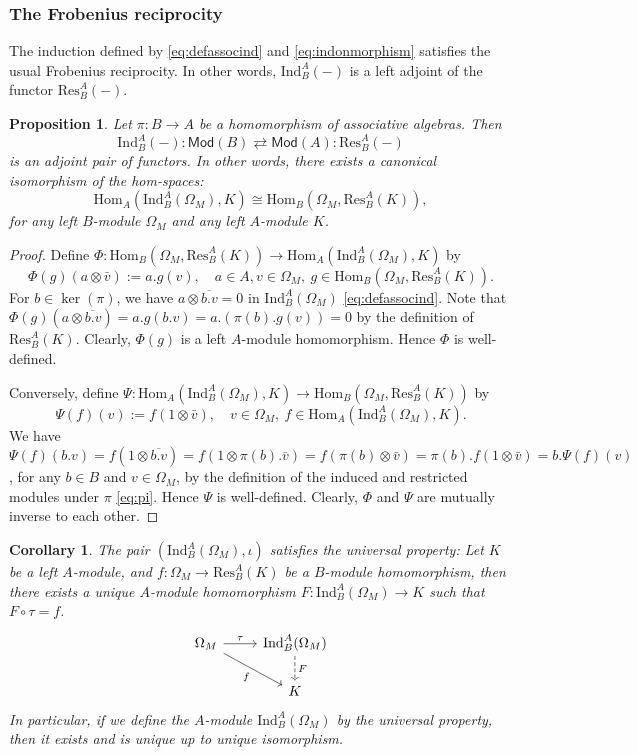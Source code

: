 \documentclass[12pt,a4paper,reqno]{amsart}
\numberwithin{equation}{section}
\numberwithin{equation}{section}
\newtheorem{prop}[thm]{Proposition}
\newtheorem{coro}[thm]{Corollary}
\theoremstyle{definition}
\def \ra {\rightarrow}
\def \Hom {\mathrm{Hom}}
\def\Ind{\mathrm{Ind}}
\def\Res{\mathrm{Res}}
\def\o{\otimes}
\def\Om{\Omega}
\def\Ind{\mathrm{Ind}}
\def\Mod{\mathsf{Mod}}
\begin{document}
	\subsubsection{The Frobenius reciprocity} The induction defined by \eqref{eq:defassocind} and \eqref{eq:indonmorphism} satisfies the usual Frobenius reciprocity. In other words, $\Ind_B^A(-)$ is a left adjoint of the functor $\Res^A_B(-)$.
	\begin{prop}\label{prop:Frobenius}
		Let $\pi: B\ra A$ be a homomorphism of associative algebras. Then 
		\begin{equation}
			\Ind_B^A(-):\Mod(B)\rightleftarrows \Mod(A): \Res_B^A(-)
		\end{equation}
		is an adjoint pair of functors. In other words, there exists a canonical isomorphism of the hom-spaces:
		\begin{equation}
			\Hom_A(\Ind_B^A(\Om_M),K)\cong \Hom_B(\Om_M,\Res^A_B(K)),
		\end{equation}
		for any left $B$-module $\Om_M$ and any left $A$-module $K$. 
	\end{prop}
	\begin{proof}
		Define $\Phi:  \Hom_B(\Om_M,\Res^A_B(K))\ra \Hom_A(\Ind_B^A(\Om_M),K)$ by
		$$\Phi(g)(a\o \bar{v}):=a.g(v),\quad a\in A, v\in \Om_M,\ g\in  \Hom_B(\Om_M,\Res^A_B(K)). $$ 
		For $b\in \ker(\pi)$, we have $a\o \overline{b.v}=0$ in $\Ind^A_B(\Om_M)$ \eqref{eq:defassocind}. Note that $\Phi(g)(a\o \overline{b.v})=a.g(b.v)=a.(\pi(b).g(v))=0$ by the definition of $\Res^A_B(K)$. Clearly, $\Phi(g)$ is a left $A$-module homomorphism. Hence $\Phi$ is well-defined. 
		
		Conversely, define $\Psi:  \Hom_A(\Ind_B^A(\Om_M),K)\ra \Hom_B(\Om_M,\Res^A_B(K))$ by 
		$$\Psi(f)(v):=f(1\o \bar{v}),\quad v\in \Om_M,\ f\in   \Hom_A(\Ind_B^A(\Om_M),K). $$
		We have $\Psi(f)(b.v)=f(1\o \overline{b.v})=f(1\o \pi(b).\bar{v})=f(\pi(b)\o \bar{v})=\pi(b).f(1\o\bar{v})=b.\Psi(f)(v)$, for any $b\in B$ and $v\in \Om_M$, by the definition of the induced and restricted modules under $\pi$ \eqref{eq:pi}. Hence $\Psi$ is well-defined. Clearly, $\Phi$ and $\Psi$ are mutually inverse to each other. 
	\end{proof}
	
	\begin{coro}
		The pair $(\Ind_B^A(\Om_M),\iota)$ satisfies the universal property: Let $K$ be a left $A$-module, and $f:\Om_M\ra \Res^A_B(K)$ be a $B$-module homomorphism, then there exists a unique $A$-module homomorphism $F:\Ind^A_B(\Om_M)\ra K$ such that $F\circ \tau=f$.  
		$$
		\begin{tikzcd}
			\Om_M\arrow[r,"\tau"]\arrow[dr,"f"']& \Ind_B^A(\Om_M)\arrow[d,"F",dashed]\\
			&K
		\end{tikzcd}
		$$
		In particular, if we define the $A$-module $\Ind^A_B(\Om_M)$ by the universal property, then it exists and is unique up to unique isomorphism. 
	\end{coro}
	
\end{document}

